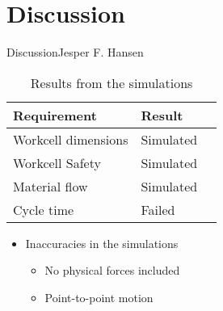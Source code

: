 \section{Discussion}
\begin{frame}{Discussion}{Jesper F. Hansen}

\begin{table}[]
    \centering
\begin{tabular}{l l l}
    \hline
    \rowcolor{beamer@barcolor}\textbf{Requirement} & \textbf{Result} \\
    \hline
    Workcell dimensions & Simulated \\
    \rowcolor{beamer@barcolor} Workcell Safety & Simulated \\
    Material flow & Simulated \\
    \rowcolor{beamer@barcolor} Cycle time & Failed \\
    \hline
\end{tabular}
\caption{Results from the simulations}
\end{table}
\begin{itemize}
    \item Inaccuracies in the simulations
    \begin{itemize}
        \item No physical forces included
        \item Point-to-point motion
    \end{itemize}
\end{itemize}
\end{frame}

